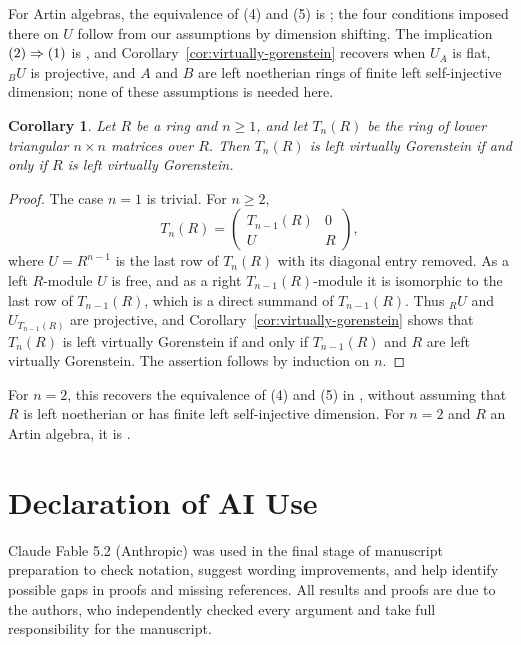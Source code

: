 \documentclass[11pt]{amsart}
\newtheorem{corollary}[theorem]{Corollary}
\theoremstyle{definition}
\theoremstyle{remark}
\theoremstyle{plain}
\numberwithin{equation}{section}
\begin{document}
For Artin algebras, the equivalence of \textup{(4)} and \textup{(5)} is
\cite[Proposition~3.3]{EHSL}; the four conditions imposed there on $U$
follow from our assumptions by dimension shifting. The implication
$\textup{(2)}\Rightarrow\textup{(1)}$ is \cite[Corollary~2.7]{Mao}, and
Corollary~\ref{cor:virtually-gorenstein} recovers \cite[Theorem~2.8]{Mao}
when $U_A$ is flat, ${}_BU$ is projective, and $A$ and $B$ are left
noetherian rings of finite left self-injective dimension; none of these
assumptions is needed here.

\begin{corollary}\label{cor:lower-triangular}
Let $R$ be a ring and $n \geq 1$, and let $T_n(R)$ be the ring of lower
triangular $n \times n$ matrices over $R$. Then $T_n(R)$ is left virtually
Gorenstein if and only if $R$ is left virtually Gorenstein.
\end{corollary}

\begin{proof}
The case $n = 1$ is trivial. For $n \geq 2$,
\[
 T_n(R) = \begin{pmatrix}T_{n-1}(R) & 0\\ U & R\end{pmatrix},
\]
where $U = R^{n-1}$ is the last row of $T_n(R)$ with its diagonal entry
removed. As a left $R$-module $U$ is free, and as a right
$T_{n-1}(R)$-module it is isomorphic to the last row of $T_{n-1}(R)$,
which is a direct summand of $T_{n-1}(R)$. Thus ${}_RU$ and
$U_{T_{n-1}(R)}$ are projective, and
Corollary~\ref{cor:virtually-gorenstein} shows that $T_n(R)$ is left
virtually Gorenstein if and only if $T_{n-1}(R)$ and $R$ are left
virtually Gorenstein. The assertion follows by induction on $n$.
\end{proof}

For $n=2$, this recovers the equivalence of
\textup{(4)} and \textup{(5)} in
\cite[Corollary~2.9]{Mao}, without assuming that $R$ is left noetherian or has finite left self-injective dimension.
For $n = 2$ and $R$ an Artin algebra, it is \cite[Example~3.4]{EHSL}.

\section*{Declaration of AI Use}

Claude Fable 5.2 (Anthropic) was used in the final stage of manuscript preparation to check notation, suggest wording improvements, and help identify possible gaps in proofs and missing references. All results and proofs are due to the authors, who independently checked every argument and take full responsibility for the manuscript.
\end{document}
